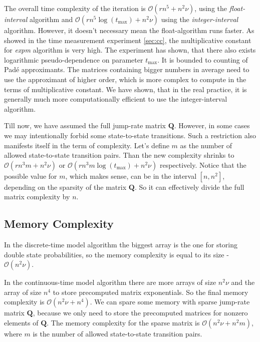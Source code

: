 \documentclass[thesis=M,english]{FITthesis}[2012/10/20]
\newcommand{\matr}[1]{\mathbf{#1}}
\begin{document}
\begin{itemize}
\begin{itemize}
\end{itemize}   

The overall time complexity of the iteration is $\mathcal{O}( r n^5 + n^2\nu )$, using the \textit{float-interval} algorithm and $\mathcal{O}( r n^5\log(t_{\max}) + n^2\nu )$ using the \textit{integer-interval} algorithm. However, it doesn't necessary mean the float-algorithm runs faster. As showed in the time measurement experiment \ref{sec:cc}, the multiplicative constant for \textit{expm} algorithm is very high. The experiment has shown, that there also exists logarithmic pseudo-dependence on parameter $t_{\max}$. It is bounded to counting of Pad\'{e} approximants. The matrices containing bigger numbers in average need to use the approximant of higher order, which is more complex to compute in the terms of multiplicative constant. We have shown, that in the real practice, it is generally much more computationally efficient to use the integer-interval algorithm.

Till now, we have assumed the full jump-rate matrix $\matr{Q}$. However, in some cases we may intentionally forbid some state-to-state transitions. Such a restriction also manifests itself in the term of complexity. Let's define $m$ as the number of allowed state-to-state transition pairs. Than the new complexity shrinks to $\mathcal{O}( r n^3 m + n^2\nu )$ or $\mathcal{O}( r n^3 m \log(t_{\max}) + n^2\nu )$ respectively. Notice that the possible value for $m$, which makes sense, can be in the interval $[n,n^2]$, depending on the sparsity of the matrix $\matr{Q}$. So it can effectively divide the full matrix complexity by $n$.  

\end{itemize}

\subsection{Memory Complexity}
In the discrete-time model algorithm the biggest array is the one for storing double state probabilities, so the memory complexity is equal to its size - $\mathcal{O}(n^2\nu)$. 

In the continuous-time model algorithm there are more arrays of size $n^2\nu$ and the array of size $n^4$ to store precomputed matrix exponentials. So the final memory complexity is $\mathcal{O}( n^2\nu + n^4 )$. We can spare some memory with sparse jump-rate matrix $\matr{Q}$, because we only need to store the precomputed matrices for nonzero elements of $\matr{Q}$. The memory complexity for the sparse matrix is $\mathcal{O}( n^2\nu + n^2 m )$, where $m$ is the number of allowed state-to-state transition pairs.
\end{document}
